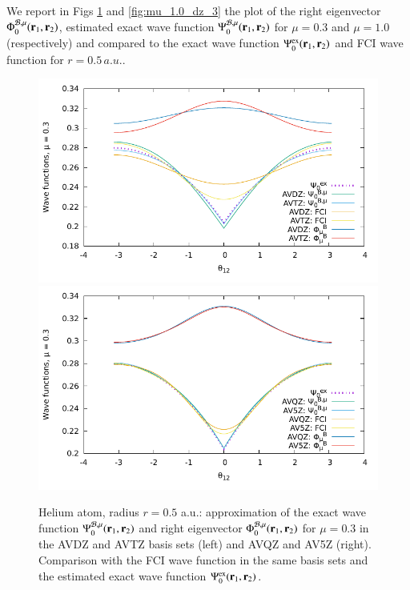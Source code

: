 \documentclass[aip,jcp,reprint,noshowkeys,superscriptaddress]{revtex4-1}
\newcommand{\br}[0]{{\bf {r}}}
\newcommand{\psiex}[0]{\Psi^{\text{ex}}_0}
\newcommand{\phimub}[0]{\Phi^{\mathcal{B},\mu}_0}
\newcommand{\psimub}[0]{\Psi^{\mathcal{B},\mu}_0}
\begin{document}
We report in Figs \ref{fig:mu_0.3_dz_3} and \ref{fig:mu_1.0_dz_3} the plot of the right eigenvector $\phimub(\br{}_1,\br{}_2)$, estimated exact wave function $\psimub(\br{}_1,\br{}_2)$ for $\mu=0.3$ and $\mu=1.0$ (respectively) and compared to the exact wave function $\psiex(\br{}_1,\br{}_2)$ and FCI wave function for $r=0.5\,a.u.$. 
\begin{figure}
 \label{fig:mu_0.3_dz_3}
        \includegraphics[width=0.45\linewidth]{plots/He/cusp/He_mu_0_3_cusp_avdz_avtz_3.pdf}
        \includegraphics[width=0.45\linewidth]{plots/He/cusp/He_mu_0_3_cusp_avqz_av5z_3.pdf}\\
        \caption{
        Helium atom, radius $r=0.5$ a.u.: approximation of the exact wave function $\psimub(\br{}_1,\br{}_2)$ and right eigenvector $\phimub(\br{}_1,\br{}_2)$ for $\mu=0.3$ in the AVDZ and AVTZ basis sets (left) and AVQZ and AV5Z (right). Comparison with the FCI wave function in the same basis sets and the estimated exact wave function $\psiex(\br{}_1,\br{}_2)$.  }
\end{figure}
\end{document}
